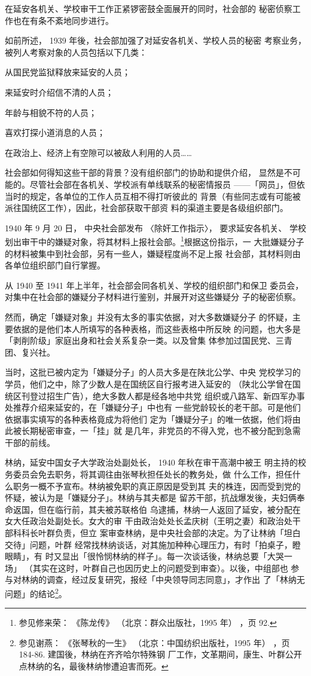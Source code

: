 在延安各机关、学校审干工作正紧锣密鼓全面展开的同时，社会部的
秘密侦察工作也在有条不紊地同步进行。

如前所述， 1939 年後，社会部加强了对延安各机关、学校人员的秘密
考察业务，被列人考察对象的人员包括以下几类：

从国民党监狱释放来延安的人员；

来延安时介绍信不清的人员；

年龄与相貌不符的人员；

喜欢打探小道消息的人员；

在政治上、经济上有空隙可以被敌人利用的人员……

社会部如何得知这些干部的背景？没有组织部门的协助和提供介绍，
显然是不可能的。尽管社会部在各机关、学校派有单线联系的秘密情报员
——「网员」，但依当时的规定，各单位的工作人员互相不得打听彼此的
背景（有些同志或有可能被派往国统区工作），因此，社会部获取干部资
料的渠道主要是各级组织部门。

1940 年 9 月 20 日，
中央社会部发布
〈除奸工作指示〉， 要求延安各机关、
学校划出审干中的嫌疑对象，将其材料上报社会部。\footnote{参见修来荣：
《陈龙传》
（北京：群众出版社，1995 年）
，页 92.}根据这份指示，一
大批嫌疑分子的材料被集中到社会部，另有一些人，嫌疑程度尚不足上报
社会部，其材料则由各单位组织部门自行掌握。

从 1940 至 1941 年上半年，社会部会同各机关、学校的组织部门和保卫
委员会，对集中在社会部的嫌疑分子材料进行鉴别，并展开对这些嫌疑分
子的秘密侦察。

然而，确定「嫌疑对象」并没有太多的事实依据，对大多数嫌疑分子
的怀疑，主要依据的是他们本人所填写的各种表格，而这些表格中所反映
的问题，也大多是「剥削阶级」家庭出身和社会关系复杂一类。以及曾集
体参加过国民党、三青团、复兴社。

当时，这批已被内定为「嫌疑分子」的人员大多是在陕北公学、中央
党校学习的学员，他们之中，除了少数人是在国统区自行报考进入延安的
（陕北公学曾在国统区刊登过招生广告），绝大多数人都是经各地中共党
组织或八路军、新四军办事处推荐介绍来延安的，在「嫌疑分子」中也有
一些党龄较长的老干部。可是他们依据事实填写的各种表格竟成为将他们
定为「嫌疑分子」的唯一依据，他们将由此被长期秘密审查，一「挂」就
是几年，非党员的不得入党，也不被分配到急需干部的前线。

林纳，延安中国女子大学政治处副处长， 1940 年秋在审干高潮中被王
明主持的校务委员会免去职务，将其调往由张琴秋担任处长的教务处，做
什么工作，担任什么职务一概不予宣布。林纳被免职的真正原因是受到其
夫的株连，因而受到党的怀疑，被认为是「嫌疑分子」。林纳与其夫都是
留苏干部，抗战爆发後，夫妇俩奉命返国，但在临行前，其夫被苏联格伯
乌逮捕，林纳一人返回了延安，被分配在女大任政治处副处长。女大的审
干由政治处处长孟庆树（王明之妻）和政治处干部科科长叶群负责，但立
案审查林纳，是中央社会部的决定。为了让林纳「坦白交待」问题，叶群
经常找林纳谈话，对其施加种种心理压力，有时「拍桌子，瞪眼睛」，有
时又显出「很怜悯林纳的样子」。每一次谈话後，林纳总要「大哭一场」
（其实在这时，叶群自己也因历史上的问题受到审查）。以後，中组部也
参与对林纳的调查，经过反复研究，报经「中央领导同志同意」，才作出
了「林纳无问题」的结论\footnote{参见谢燕：
《张琴秋的一生》
（北京：中国纺织出版社，1995 年）
，页 184-86. 建国後，林纳在齐齐哈尔特殊钢
厂工作，文革期间，康生、叶群公开点林纳的名，最後林纳惨遭迫害而死。
 }。

